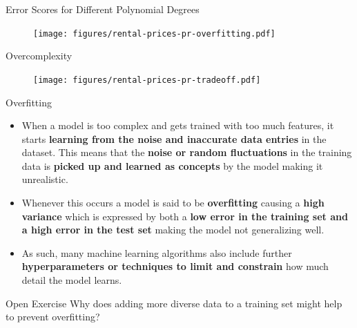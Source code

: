 \documentclass[document.tex]{subfiles}
\begin{document}
    \begin{frame}{Error Scores for Different Polynomial Degrees}
        \begin{figure}
            \label{fig:rental-prices-pr-overfitting}
            \texttt{[image: figures/rental-prices-pr-overfitting.pdf]}
        \end{figure}
    \end{frame}

    \begin{frame}{Overcomplexity}
        \begin{figure}
            \label{fig:rental-prices-pr-tradeoff}
            \texttt{[image: figures/rental-prices-pr-tradeoff.pdf]}
        \end{figure}
    \end{frame}

    \begin{frame}{Overfitting}
        \begin{itemize}
            \item When a model is too complex and gets trained with too much features, it starts \textbf{learning from the noise and inaccurate data entries} in the dataset. This means that the \textbf{noise or random fluctuations} in the training data is \textbf{picked up and learned as concepts} by the model making it unrealistic.
            \item Whenever this occurs a model is said to be \textbf{overfitting} causing a \textbf{high variance} which is expressed by both a \textbf{low error in the training set and a high error in the test set} making the model not generalizing well.
            \item As such, many machine learning algorithms also include further \textbf{hyperparameters or techniques to limit and constrain} how much detail the model learns.
        \end{itemize}
    \end{frame}

    \begin{frame}{Open Exercise }
        Why does adding more diverse data to a training set might help to prevent overfitting?
    \end{frame}
    
\end{document}
